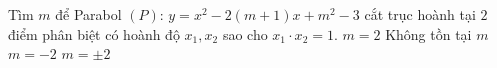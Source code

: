 

\begin{ex}%
	Tìm $m$ để Parabol $(P)$: $y=x^2-2(m+1)x+m^2-3$ cắt trục hoành tại $2$ điểm phân biệt có hoành độ $x_1,x_2$ sao cho $x_1\cdot x_2=1$.
	\choice        
	{\True $m=2$}
	{Không tồn tại $m$}
	{$m=-2$}
	{$m=\pm 2$}
\end{ex}

